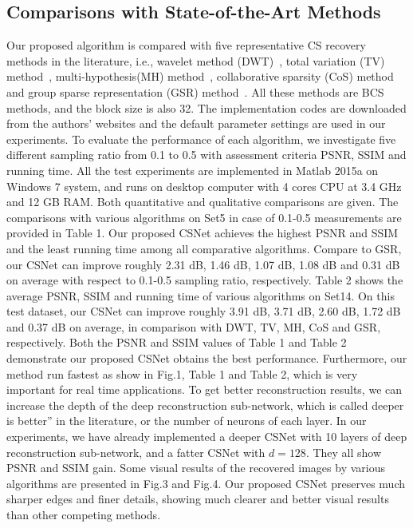 \documentclass[5pt]{article}
\begin{document}
\subsection{Comparisons with State-of-the-Art Methods}

Our proposed algorithm is compared with five representative CS recovery methods in the literature, i.e., wavelet method (DWT)~\cite{rf27}, total variation (TV) method~\cite{rf7}, multi-hypothesis(MH) method~\cite{rf10}, collaborative sparsity (CoS) method~\cite{rf28} and group sparse representation (GSR) method~\cite{rf11}. All these methods are BCS methods, and the block size is also 32. The implementation codes are downloaded from the authors’ websites and the default parameter settings are used in our experiments. To evaluate the performance of each algorithm, we investigate five different sampling ratio from 0.1 to 0.5 with assessment criteria PSNR, SSIM and running time. All the test experiments are implemented in Matlab 2015a on Windows 7 system, and runs on desktop computer with 4 cores CPU at 3.4 GHz and 12 GB RAM. Both quantitative and qualitative comparisons are given. The comparisons with various algorithms on Set5 in case of 0.1-0.5 measurements are provided in Table 1. Our proposed CSNet achieves the highest PSNR and SSIM and the least running time among all comparative algorithms. Compare to GSR, our CSNet can improve roughly 2.31 dB, 1.46 dB, 1.07 dB, 1.08 dB and 0.31 dB on average with respect to 0.1-0.5 sampling ratio, respectively. Table 2 shows the average PSNR, SSIM and running time of various algorithms on Set14. On this test dataset, our CSNet can improve roughly 3.91 dB, 3.71 dB, 2.60 dB, 1.72 dB and 0.37 dB on average, in comparison with DWT, TV, MH, CoS and GSR, respectively. Both the PSNR and SSIM values of Table 1 and Table 2 demonstrate our proposed CSNet obtains the best performance. Furthermore, our method run fastest as show in Fig.1, Table 1 and Table 2, which is very important for real time applications. To get better reconstruction results, we can increase the depth of the deep reconstruction sub-network, which is called deeper is better” in the literature, or the number of neurons of each layer. In our experiments, we have already implemented a deeper CSNet with 10 layers of deep reconstruction sub-network, and a fatter CSNet with $d = 128$. They all show PSNR and SSIM gain. Some visual results of the recovered images by various algorithms are presented in Fig.3 and Fig.4. Our proposed CSNet preserves much sharper edges and finer details, showing much clearer and better visual results than other competing methods.
\end{document}
